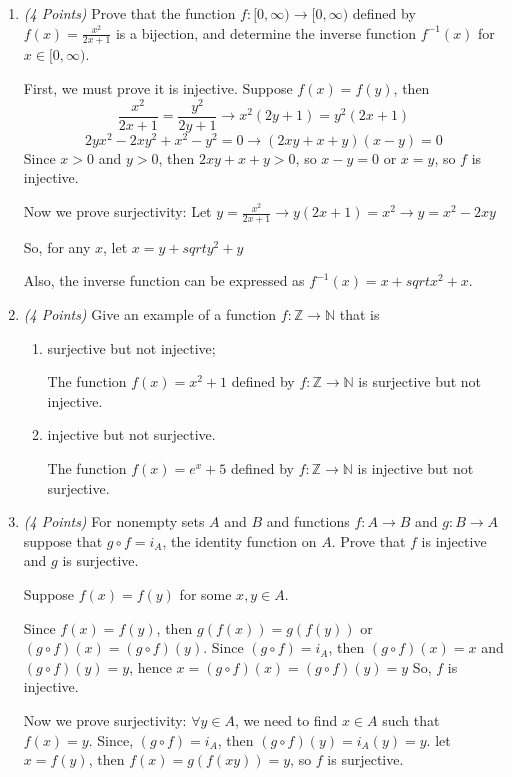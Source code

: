 \documentclass[10pt]{article} %
\newcommand{\N}{\mathbb{N}}
\newcommand{\Z}{\mathbb{Z}}
\newcommand{\points}[1]{{\it (#1 Points)}}
\begin{document}
\begin{enumerate}
 \item \points{4}
Prove that the function $f:[0,\infty)\to [0,\infty)$ defined by $f(x)=\displaystyle\frac{x^2}{2x+1}$ is a bijection, and determine the inverse function $f^{-1}(x)$ for $x\in [0,\infty)$.

 First, we must prove it is injective.  Suppose $f(x)=f(y)$, then $$\frac{x^2}{2x+1}=\frac{y^2}{2y+1} \rightarrow x^2(2y+1)=y^2(2x+1)$$
$$2yx^2-2xy^2+x^2-y^2=0 \rightarrow (2xy+x+y)(x-y)=0$$
Since $x>0$ and $y>0$, then $2xy+x+y>0$, so $x-y=0$ or $x=y$, so $f$ is injective.  

Now we prove surjectivity: Let $y=\frac{x^2}{2x+1} \rightarrow y(2x+1)=x^2 \rightarrow y=x^2-2xy$

So, for any $x$, let $x=y+sqrt{y^2+y}$

Also, the inverse function can be expressed as $f^{-1}(x) = x+sqrt{x^2+x}$.  



\item \points{4} Give an example of a function $f:\Z\to \N$ that is
\begin{enumerate}
  \item surjective but not injective;
  
   The function $f(x)=x^2+1$ defined by $f:\Z\to \N$ is surjective but not injective.  
  \item injective but not surjective.
  
   The function $f(x)=e^x+5$ defined by $f:\Z\to \N$ is injective but not surjective.  
\end{enumerate}

\item\points{4} For nonempty sets $A$ and $B$ and functions $f : A \rightarrow
  B$ and $g: B \rightarrow A$ suppose that $g \circ f = i_A$, the
  identity function on $A$. Prove that $f$ is injective and $g$ is surjective.
  
   Suppose $f(x)=f(y)$ for some $x,y\in A$.
  
  Since $f(x)=f(y)$, then $g(f(x))=g(f(y))$ or $(g \circ f)(x)=(g \circ f)(y)$.  Since $(g \circ f)=i_A$, then $(g \circ f)(x)=x$ and $(g \circ f)(y)=y$, hence $x = (g \circ f)(x) = (g \circ f)(y)=y$ So, $f$ is injective. 
  
  Now we prove surjectivity:
  $\forall y \in A$, we need to find $x\in A$ such that $f(x)=y$.  Since, $(g \circ f)=i_A$, then $(g \circ f)(y)=i_A(y)=y$.  let $x=f(y)$, then $f(x)=g(f(xy)) = y$, so $f$ is surjective.  



\end{enumerate}
\end{document}
